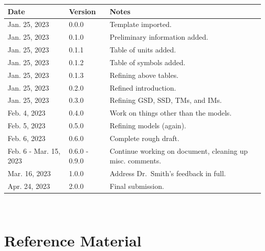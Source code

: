 \documentclass[12pt]{article}
\begin{document}
\begin{tabularx}{\textwidth}{p{3cm}p{2cm}X}
    \toprule {\bf Date}    & {\bf Version} & {\bf Notes}                                               \\
    \midrule
    Jan. 25, 2023          & 0.0.0         & Template imported.                                        \\
    Jan. 25, 2023          & 0.1.0         & Preliminary information added.                            \\
    Jan. 25, 2023          & 0.1.1         & Table of units added.                                     \\
    Jan. 25, 2023          & 0.1.2         & Table of symbols added.                                   \\
    Jan. 25, 2023          & 0.1.3         & Refining above tables.                                    \\
    Jan. 25, 2023          & 0.2.0         & Refined introduction.                                     \\
    Jan. 25, 2023          & 0.3.0         & Refining GSD, SSD, TMs, and IMs.                          \\
    Feb. 4, 2023           & 0.4.0         & Work on things other than the models.                     \\
    Feb. 5, 2023           & 0.5.0         & Refining models (again).                                  \\
    Feb. 6, 2023           & 0.6.0         & Complete rough draft.                                     \\
    Feb. 6 - Mar. 15, 2023 & 0.6.0 - 0.9.0 & Continue working on document, cleaning up misc. comments. \\
    Mar. 16, 2023          & 1.0.0         & Address Dr.~Smith's feedback in full.                     \\
    Apr. 24, 2023          & 2.0.0         & Final submission.                                         \\
    \bottomrule
\end{tabularx}

~\newpage


\section{Reference Material}
\end{document}
